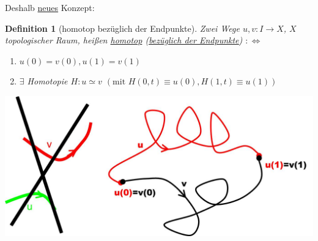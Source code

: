 \documentclass[a4paper,11pt,notitlepage]{report}
\newtheorem{definition}{Definition}[chapter]
\begin{document}
Deshalb \underline{neues} Konzept:

\begin{definition}[homotop bezüglich der Endpunkte]
	Zwei Wege $u,v \colon I \rightarrow X$, $X$ topologischer Raum, heißen \underline{homotop} (\underline{\underline{bezüglich der Endpunkte}})
	$:\Leftrightarrow$
	\begin{enumerate}
		\item $u(0) = v(0), u(1) = v(1)$
		\item $\exists$ Homotopie $H \colon u \simeq v$ $\left(\text{mit } H(0,t) \equiv u(0), H(1,t) \equiv u(1)\right)$
	\end{enumerate}
	\includegraphics[scale=0.4]{images/Homotop_Endpunkte.jpg}		
\end{definition}
\end{document}
